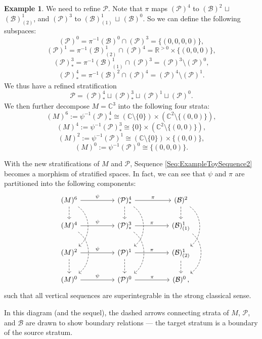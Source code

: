 \documentclass[12pt]{amsart}
\theoremstyle{definition}
\newtheorem{example}[theorem]{Example}
\numberwithin{equation}{section}
\newcommand{\SET}[1]{\{#1\}}
\begin{document}
\begin{example}
We need to  refine $\mathcal{P} $. Note that $\pi$ maps $(\mathcal{P})^4    $ to $(\mathcal{B})^2$ $\sqcup$ $ (\mathcal{B})^1_{(2)}  $, and $(\mathcal{P})^3 $ to $(\mathcal{B})^1_{(1)}  $ $\sqcup$ $(\mathcal{B})^0    $. So we can define the following subspaces:
$$(\mathcal{P})^0  =\pi^{-1} (\mathcal{B})^0\cap (\mathcal{P})^3  =\SET{(0,0,0,0)}, 
 $$
$$  (\mathcal{P})^1   =
 \pi^{-1} (\mathcal{B})^1_{(2)} \cap (\mathcal{P})^4 =\mathbb{R}^{> 0}\times \SET{(0,0,0)},
$$
$$(\mathcal{P})^3_{*}  
=\pi^{-1} (\mathcal{B})^1_{(1)}   \cap (\mathcal{P})^3
= (\mathcal{P})^3  \setminus    (\mathcal{P})^0  ,
$$
$$(\mathcal{P})^4_{*}   =\pi^{-1}
(\mathcal{B} )^2 \cap (\mathcal{P})^4
= (\mathcal{P})^4   \setminus    (\mathcal{P})^1    .
$$
We thus have a refined stratification $$
  \mathcal{P} = (\mathcal{P})^4_*         \sqcup (\mathcal{P})^3_{*}   \sqcup (\mathcal{P})^1       \sqcup (\mathcal{P})^0     .
  $$ 
 We then further decompose $M =\mathbb{C}^3$ into the following four strata:
 $$(M)^6        :=\psi^{-1} (\mathcal{P})^4_*         
 \cong    (\mathbb{C}\setminus \SET{0})\times (\mathbb{C}^2\setminus \SET{(0,0)}),
 $$
 $$
 (M)^4          :=
 \psi^{-1}(\mathcal{P} )^3_* 
 \cong      \SET{0} \times (\mathbb{C}^2\setminus \SET{(0,0)}),
  $$
$$(M)^2         :=\psi^{-1}
 (\mathcal{P})^1      
 \cong    (\mathbb{C}\setminus \SET{0})\times \SET{(0,0)} ,
 $$
$$(M)^0          :=\psi^{-1}
 (\mathcal{P})^0      
 \cong      \SET{(0,0,0)} .
 $$
 
 
 With the new stratifications of $M$ and $\mathcal{P}$, Sequence \eqref{Seq:ExampleToySequence2} becomes a morphism of stratified spaces. In fact,   we can see that $\psi$ and $\pi$ are partitioned into   the following components:
\begin{equation}
	\label{Diagram:EXAMPLEM6}
	\begin{tikzcd}
		(M)^6         \arrow[d,dashed] \arrow[dd,bend left=55,dashed]    \arrow[rr,"\psi "] && (\mathcal{P})^4_*           \arrow[d,dashed] \arrow[dd,bend left=55,dashed] \arrow[rr,"\pi " ]   && (\mathcal{B})^2    \arrow[d,dashed] \arrow[dd,bend left=55,dashed] \\
		(M)^4           \arrow[dd,bend left=55,dashed]  \arrow[rr ,"\psi "] && (\mathcal{P})^{3}_*  \arrow[dd,bend left=55,dashed]  \arrow[rr ,"\pi "]  && (\mathcal{B})^1_{(1)}   \arrow[dd,bend left=55,dashed]  \\ (M)^2           \arrow[rr,"\psi "]\arrow[d,dashed]
		&& (\mathcal{P})^1      \arrow[rr,"\pi "] \arrow[d,dashed]&&  (\mathcal{B})^1_{(2)}   \arrow[d,dashed]
\\ (M)^0     \arrow[rr,"\psi "]
		&& (\mathcal{P})^0       \arrow[rr,"\pi "] && (\mathcal{B})^0  \,, \end{tikzcd}
\end{equation}
  such that all vertical sequences are superintegrable in the strong classical sense.
  
  
  In this diagram (and the sequel), the dashed arrows connecting strata of $M $, $\mathcal{P} $, and $\mathcal{B} $ are drawn to  show   boundary relations ---   the target stratum is a boundary of the source stratum.  
  
  \end{example}
   
\end{document}
